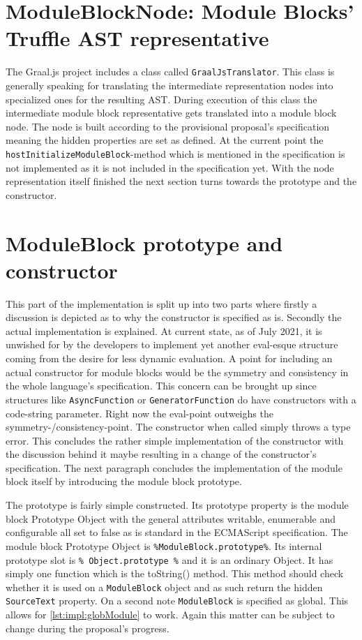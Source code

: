 \section{ModuleBlockNode: Module Blocks' Truffle AST representative}

The Graal.js project includes a class called \texttt{GraalJsTranslator}. This class is generally speaking for translating the intermediate representation nodes into specialized ones for the resulting AST. During execution of this class the intermediate module block representative gets translated into a module block node. The node is built according to the provisional proposal's specification meaning the hidden properties are set as defined. At the current point the \texttt{hostInitializeModuleBlock}-method which is mentioned in the specification is not implemented as it is not included in the specification yet. With the node representation itself finished the next section turns towards the prototype and the constructor.

\section{ModuleBlock prototype and constructor}

This part of the implementation is split up into two parts where firstly a discussion is depicted as to why the constructor is specified as is. Secondly the actual implementation is explained. At current state, as of July 2021, it is unwished for by the developers to implement yet another eval-esque structure coming from the desire for less dynamic evaluation. A point for including an actual constructor for module blocks would be the symmetry and consistency in the whole language's specification. This concern can be brought up since structures like \texttt{AsyncFunction} or \texttt{GeneratorFunction} do have constructors with a code-string parameter. Right now the eval-point outweighs the symmetry-/consistency-point. The constructor when called simply throws a type error. This concludes the rather simple implementation of the constructor with the discussion behind it maybe resulting in a change of the constructor's specification. The next paragraph concludes the implementation of the module block itself by introducing the module block prototype.

The prototype is fairly simple constructed. Its prototype property is the module block Prototype Object with the general attributes writable, enumerable and configurable all set to false as is standard in the ECMAScript specification. The module block Prototype Object is \texttt{\%ModuleBlock.prototype\%}. Its internal prototype slot is \texttt{\% Object.prototype \%} and it is an ordinary Object. It has simply one function which is the toString() method. This method should check whether it is used on a \texttt{ModuleBlock} object and as such return the hidden \texttt{SourceText} property.
On a second note \texttt{ModuleBlock} is specified as global. This allows for \ref{lst:impl:globModule} to work. Again this matter can be subject to change during the proposal's progress.

